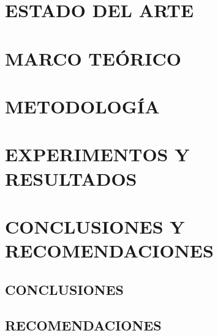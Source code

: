 \documentclass[12pt,twoside]{article}
\let\stdsection\section
\renewcommand\section{\cleardoublepage\stdsection}
\begin{document}
\section{\label{sec:estado_arte}ESTADO DEL ARTE}
\lipsum[1-5]


\section{\label{sec:marcoteorico}MARCO TEÓRICO}
\lipsum[1-5]


\section{\label{sec:metodologia}METODOLOGÍA}
\lipsum[1-5]


\section{\label{sec:experimentos}EXPERIMENTOS Y RESULTADOS}
\lipsum[1-5]


\section{\label{sec:conclusiones}CONCLUSIONES Y RECOMENDACIONES}
\lipsum[1-1]

\subsection{CONCLUSIONES}
\lipsum[1-5]


\subsection{RECOMENDACIONES}
\lipsum[1-5]

\lipsum[1-5]~\cite{Ramirezetal2013GuiaIcontec}

\cleardoublepage{}


\nocite{*}

\end{document}
